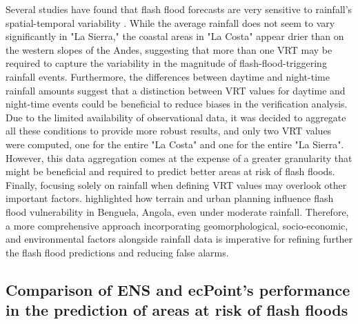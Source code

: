 \documentclass[techmemo]{ecmwfrep}%
\begin{document}
Several studies have found that flash flood forecasts are very sensitive to rainfall's spatial-temporal variability \citep{Borga2014, Demissie2021, Douinot2016, Norbiato2008, Song2019}. While the average rainfall does not seem to vary significantly in "La Sierra," the coastal areas in "La Costa" appear drier than on the western slopes of the Andes, suggesting that more than one VRT may be required to capture the variability in the magnitude of flash-flood-triggering rainfall events. Furthermore, the differences between daytime and night-time rainfall amounts suggest that a distinction between VRT values for daytime and night-time events could be beneficial to reduce biases in the verification analysis. Due to the limited availability of observational data, it was decided to aggregate all these conditions to provide more robust results, and only two VRT values were computed, one for the entire "La Costa" and one for the entire "La Sierra". However, this data aggregation comes at the expense of a greater granularity that might be beneficial and required to predict better areas at risk of flash floods. Finally, focusing solely on rainfall when defining VRT values may overlook other important factors. \cite{Dinis2021} highlighted how terrain and urban planning influence flash flood vulnerability in Benguela, Angola, even under moderate rainfall. Therefore, a more comprehensive approach incorporating geomorphological, socio-economic, and environmental factors alongside rainfall data is imperative for refining further the flash flood predictions and reducing false alarms.

\subsection{Comparison of ENS and ecPoint’s performance in the prediction of areas at risk of flash floods}
\end{document}
